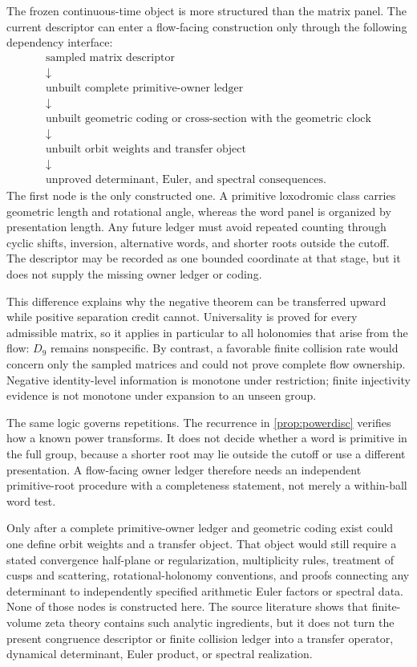 \documentclass[11pt,a4paper]{article}
\theoremstyle{definition}
\theoremstyle{remark}
\begin{document}
The frozen continuous-time object is more structured than the matrix panel. The current descriptor can enter a flow-facing construction only through the following dependency interface:
\[
\begin{array}{c}
 \text{sampled matrix descriptor}\\
 \downarrow\\
 \text{unbuilt complete primitive-owner ledger}\\
 \downarrow\\
 \text{unbuilt geometric coding or cross-section with the geometric clock}\\
 \downarrow\\
 \text{unbuilt orbit weights and transfer object}\\
 \downarrow\\
 \text{unproved determinant, Euler, and spectral consequences}.
\end{array}
\]
The first node is the only constructed one. A primitive loxodromic class carries geometric length and rotational angle, whereas the word panel is organized by presentation length. Any future ledger must avoid repeated counting through cyclic shifts, inversion, alternative words, and shorter roots outside the cutoff. The descriptor may be recorded as one bounded coordinate at that stage, but it does not supply the missing owner ledger or coding.

This difference explains why the negative theorem can be transferred upward while positive separation credit cannot. Universality is proved for every admissible matrix, so it applies in particular to all holonomies that arise from the flow: \(D_9\) remains nonspecific. By contrast, a favorable finite collision rate would concern only the sampled matrices and could not prove complete flow ownership. Negative identity-level information is monotone under restriction; finite injectivity evidence is not monotone under expansion to an unseen group.

The same logic governs repetitions. The recurrence in \cref{prop:powerdisc} verifies how a known power transforms. It does not decide whether a word is primitive in the full group, because a shorter root may lie outside the cutoff or use a different presentation. A flow-facing owner ledger therefore needs an independent primitive-root procedure with a completeness statement, not merely a within-ball word test.

Only after a complete primitive-owner ledger and geometric coding exist could one define orbit weights and a transfer object. That object would still require a stated convergence half-plane or regularization, multiplicity rules, treatment of cusps and scattering, rotational-holonomy conventions, and proofs connecting any determinant to independently specified arithmetic Euler factors or spectral data. None of those nodes is constructed here. The source literature shows that finite-volume zeta theory contains such analytic ingredients, but it does not turn the present congruence descriptor or finite collision ledger into a transfer operator, dynamical determinant, Euler product, or spectral realization.
\end{document}
